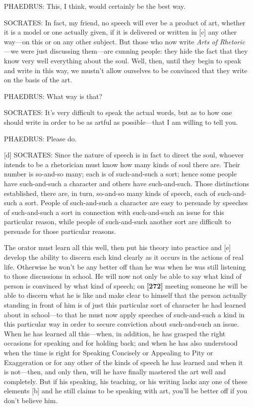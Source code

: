 PHAEDRUS: This, I think, would certainly be the best way.

SOCRATES: In fact, my friend, no speech will ever be a product of art,
whether it is a model or one actually given, if it is delivered or
written in {[}c{]} any other way---on this or on any other subject. But
those who now write {\em Arts of Rhetoric}---we were just discussing
them---are cunning people: they hide the fact that they know very well
everything about the soul. Well, then, until they begin to speak and
write in this way, we mustn't allow ourselves to be convinced that they
write on the basis of the art.

PHAEDRUS: What way is that?

SOCRATES: It's very difficult to speak the actual words, but as to how
one should write in order to be as artful as possible---that I am
willing to tell you.

PHAEDRUS: Please do.

{[}d{]} SOCRATES: Since the nature of speech is in fact to direct the
soul, whoever intends to be a rhetorician must know how many kinds of
soul there are. Their number is so-and-so many; each is of such-and-such
a sort; hence some people have such-and-such a character and others have
such-and-such. Those distinctions established, there are, in turn,
so-and-so many kinds of speech, each of such-and-such a sort. People of
such-and-such a character are easy to persuade by speeches of
such-and-such a sort in connection with such-and-such an issue for this
particular reason, while people of such-and-such another sort are
difficult to persuade for those particular reasons.

The orator must learn all this well, then put his theory into practice
and {[}e{]} develop the ability to discern each kind clearly as it
occurs in the actions of real life. Otherwise he won't be any better off
than he was when he was still listening to those discussions in school.
He will now not only be able to say what kind of person is convinced by
what kind of speech; on {\bf {[}272{]}} meeting someone he will be able
to discern what he is like and make clear to himself that the person
actually standing in front of him is of just this particular sort of
character he had learned about in school---to that he must now apply
speeches of such-and-such a kind in this particular way in order to
secure conviction about such-and-such an issue. When he has learned all
this---when, in addition, he has grasped the right occasions for
speaking and for holding back; and when he has also understood when the
time is right for Speaking Concisely or Appealing to Pity or
Exaggeration or for any other of the kinds of speech he has learned and
when it is not---then, and only then, will he have finally mastered the
art well and completely. But if his speaking, his teaching, or his
writing lacks any one of these elements {[}b{]} and he still claims to
be speaking with art, you'll be better off if you don't believe him.

